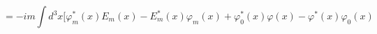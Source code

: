 \begin{equation}
 =-im\int d^3 x\biggl [\varphi_m^*
(x)E_m (x) - E_m^* (x)\varphi_m (x)+\varphi_0^* (x)\varphi (x)
-\varphi^* (x)\varphi_0 (x)
 \label{90}
\end{equation}

